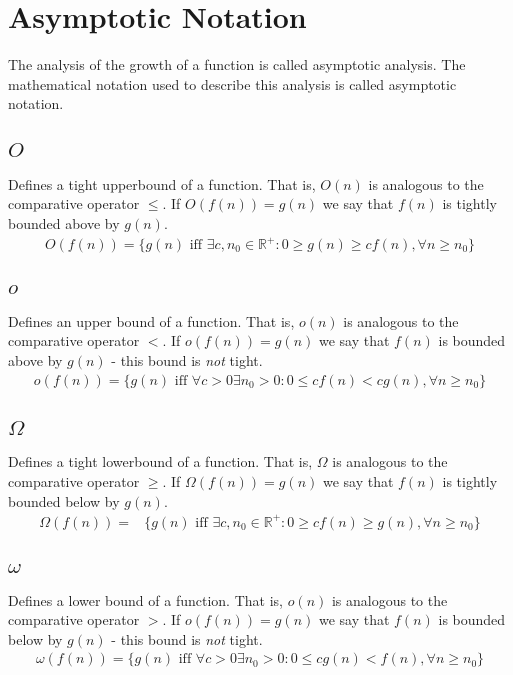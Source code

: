 
\thispagestyle{fancyplain}

\chapter{Asymptotic Notation}
\label{ch:asymptoticnotation}
The analysis of the growth of a function is called asymptotic analysis. The
mathematical notation used to describe this analysis is called asymptotic
notation.

\section{$O$}
\label{ch:asymptoticnotation|sec:big-o}
Defines a tight upperbound of a function. That is, $O(n)$ is analogous to the
comparative operator $\leq$. If $O(f(n)) = g(n)$ we say that $f(n)$ is tightly
bounded above by $g(n)$.
\begin{align}
	O(f(n)) =
	\{g(n) \text{ iff } \exists c, n_0 \in \mathbb{R}^{+} :
	0 \geq g(n) \geq c f(n), \forall n \geq n_0 \}
\end{align}

\section{$o$}
\label{ch:asymptoticnotation|sec:little-o}
Defines an upper bound of a function. That is, $o(n)$ is analogous to the
comparative operator $<$. If $o(f(n)) = g(n)$ we say that $f(n)$ is bounded
above by $g(n)$ - this bound is \textit{not} tight.
\begin{align}
	o(f(n)) =
	\{g(n) \text{ iff } \forall c > 0 \exists n_0 > 0 :
	0 \leq c f(n) < c g(n), \forall n \geq n_0 \}
\end{align}

\section{$\Omega$}
\label{ch:asymptoticnotation|sec:big-omega}
Defines a tight lowerbound of a function. That is, $\Omega$ is analogous to
the comparative operator $\geq$. If $\Omega(f(n)) = g(n)$ we say that $f(n)$
is tightly bounded below by $g(n)$.
\begin{align}
	\Omega(f(n)) =
	&\{g(n) \text{ iff } \exists c, n_0 \in \mathbb{R}^{+} :
	0 \geq c f(n) \geq g(n), \forall n \geq n_0 \}
\end{align}

\section{$\omega$}
\label{ch:asymptoticnotation|sec:litte-omega}
Defines a lower bound of a function. That is, $o(n)$ is analogous to the
comparative operator $>$. If $o(f(n)) = g(n)$ we say that $f(n)$ is bounded
below by $g(n)$ - this bound is \textit{not} tight.
\begin{align}
	\omega(f(n)) =
	\{g(n) \text{ iff } \forall c > 0 \exists n_0 > 0 :
	0 \leq c g(n) < f(n), \forall n \geq n_0 \}
\end{align}

